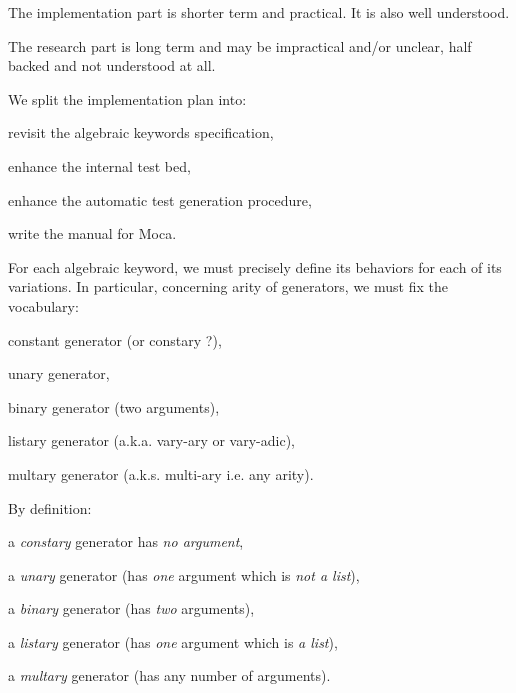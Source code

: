 The implementation part is shorter term and practical. It is also well understood.

The research part is long term and may be impractical and/or unclear, half
backed and not understood at all.



We split the implementation plan into:

\begin{citemize}
  \item revisit the algebraic keywords specification,
  \item enhance the internal test bed,
  \item enhance the automatic test generation procedure,
  \item write the manual for Moca.
\end{citemize}



For each algebraic keyword, we must precisely define its behaviors for each
of its variations. In particular, concerning arity of generators, we must fix
the vocabulary:

\begin{citemize}
  \item constant generator (or constary ?),
  \item unary generator,
  \item binary generator (two arguments),
  \item listary generator (a.k.a. vary-ary or vary-adic),
  \item multary generator (a.k.s. multi-ary i.e. any arity).
\end{citemize}



By definition:
\begin{citemize}
  \item a {\em constary} generator has {\em no argument},
  \item a {\em unary} generator (has {\em one} argument which is {\em not a list}),
  \item a {\em binary} generator (has {\em two} arguments),
  \item a {\em listary} generator (has {\em one} argument which is {\em a list}),
  \item a {\em multary} generator (has any number of arguments).
\end{citemize}

